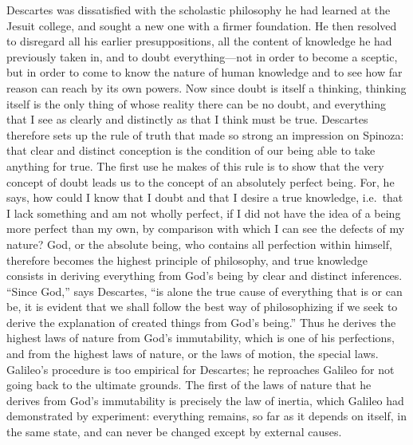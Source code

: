 \documentclass[12pt]{book}
\newcommand{\opage}[1]{\marginnote{\footnotesize\textit{[#1]}}}
\begin{document}
Descartes was dissatisfied with the scholastic philosophy he had learned at the
Jesuit college, and sought a new one with a firmer foundation. He then resolved to
disregard all his earlier presuppositions, all the content of knowledge he had
previously taken in, and to doubt everything---not in order to become a sceptic, but
in order to come to know the nature of human knowledge and to see how far reason can
reach by its own powers. Now since doubt is itself a thinking, thinking itself is the
only thing of whose reality there can be no doubt, and everything that I see as
clearly and distinctly as that I think must be true. Descartes therefore sets up the
rule of truth that made so \opage{14}strong an impression on Spinoza: that clear and
distinct conception is the condition of our being able to take anything for true.
The first use he makes of this rule is to show that the very concept of doubt leads
us to the concept of an absolutely perfect being. For, he says, how could I know that
I doubt and that I desire a true knowledge, i.e.\ that I lack something and am not
wholly perfect, if I did not have the idea of a being more perfect than my own, by
comparison with which I can see the defects of my nature? God, or the absolute being,
who contains all perfection within himself, therefore becomes the highest principle
of philosophy, and true knowledge consists in deriving everything from God's being
by clear and distinct inferences. ``Since God,'' says Descartes, ``is alone the true
cause of everything that is or can be, it is evident that we shall follow the best
way of philosophizing if we seek to derive the explanation of created things from
God's being.'' Thus he derives the highest laws of nature from God's immutability,
which is one of his perfections, and from the highest laws of nature, or the laws of
motion, the special laws. Galileo's procedure is too empirical for Descartes; he
reproaches Galileo for not going back to the ultimate grounds. The first of the laws
of nature that he derives from God's immutability is precisely the law of inertia,
which Galileo had demonstrated by experiment: everything remains, so far as it
depends on itself, in the same state, and can never be changed except by external
causes.
\end{document}
